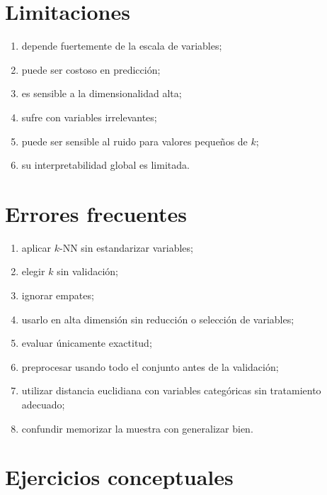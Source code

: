 \documentclass[
  spanish,
  11pt,
  letterpaper,
  DIV=11,
  numbers=noendperiod]{scrreprt}
\providecommand{\tightlist}{%
  \setlength{\itemsep}{0pt}\setlength{\parskip}{0pt}}
\theoremstyle{definition}
\theoremstyle{plain}
\theoremstyle{definition}
\theoremstyle{remark}
\begin{document}
\section{Limitaciones}\label{limitaciones}

\begin{enumerate}
\def\labelenumi{\arabic{enumi}.}
\tightlist
\item
  depende fuertemente de la escala de variables;
\item
  puede ser costoso en predicción;
\item
  es sensible a la dimensionalidad alta;
\item
  sufre con variables irrelevantes;
\item
  puede ser sensible al ruido para valores pequeños de \(k\);
\item
  su interpretabilidad global es limitada.
\end{enumerate}

\section{Errores frecuentes}\label{errores-frecuentes-11}

\begin{enumerate}
\def\labelenumi{\arabic{enumi}.}
\tightlist
\item
  aplicar \(k\)-NN sin estandarizar variables;
\item
  elegir \(k\) sin validación;
\item
  ignorar empates;
\item
  usarlo en alta dimensión sin reducción o selección de variables;
\item
  evaluar únicamente exactitud;
\item
  preprocesar usando todo el conjunto antes de la validación;
\item
  utilizar distancia euclidiana con variables categóricas sin
  tratamiento adecuado;
\item
  confundir memorizar la muestra con generalizar bien.
\end{enumerate}

\section{Ejercicios conceptuales}\label{ejercicios-conceptuales-11}
\end{document}
